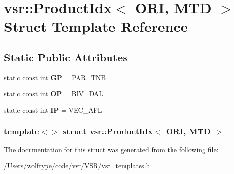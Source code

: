 \hypertarget{structvsr_1_1_product_idx_3_01_o_r_i_00_01_m_t_d_01_4}{\section{vsr\-:\-:Product\-Idx$<$ O\-R\-I, M\-T\-D $>$ Struct Template Reference}
\label{structvsr_1_1_product_idx_3_01_o_r_i_00_01_m_t_d_01_4}
}
\subsection*{Static Public Attributes}
\begin{DoxyCompactItemize}
\item 
\hypertarget{structvsr_1_1_product_idx_3_01_o_r_i_00_01_m_t_d_01_4_aa74ea61fd9c20d8f4bdeb138d08368e5}{static const int {\bfseries G\-P} = P\-A\-R\-\_\-\-T\-N\-B}\label{structvsr_1_1_product_idx_3_01_o_r_i_00_01_m_t_d_01_4_aa74ea61fd9c20d8f4bdeb138d08368e5}

\item 
\hypertarget{structvsr_1_1_product_idx_3_01_o_r_i_00_01_m_t_d_01_4_a5447d826e3c1b86b81ef02d57d349dc1}{static const int {\bfseries O\-P} = B\-I\-V\-\_\-\-D\-A\-L}\label{structvsr_1_1_product_idx_3_01_o_r_i_00_01_m_t_d_01_4_a5447d826e3c1b86b81ef02d57d349dc1}

\item 
\hypertarget{structvsr_1_1_product_idx_3_01_o_r_i_00_01_m_t_d_01_4_a02ade1becc7ca82257c21e08f0303b36}{static const int {\bfseries I\-P} = V\-E\-C\-\_\-\-A\-F\-L}\label{structvsr_1_1_product_idx_3_01_o_r_i_00_01_m_t_d_01_4_a02ade1becc7ca82257c21e08f0303b36}

\end{DoxyCompactItemize}
\subsubsection*{template$<$$>$ struct vsr\-::\-Product\-Idx$<$ O\-R\-I, M\-T\-D $>$}



The documentation for this struct was generated from the following file\-:\begin{DoxyCompactItemize}
\item 
/\-Users/wolftype/code/vsr/\-V\-S\-R/vsr\-\_\-templates.\-h\end{DoxyCompactItemize}
